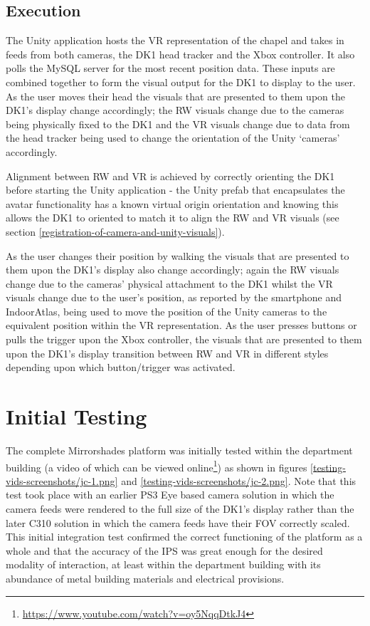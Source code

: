 \subsection{Execution}
The Unity application hosts the VR representation of the chapel and takes in feeds from both cameras, the DK1 head tracker and the Xbox controller. It also polls the MySQL server for the most recent position data. These inputs are combined together to form the visual output for the DK1 to display to the user. As the user moves their head the visuals that are presented to them upon the DK1's display change accordingly; the RW visuals change due to the cameras being physically fixed to the DK1 and the VR visuals change due to data from the head tracker being used to change the orientation of the Unity `cameras' accordingly.

Alignment between RW and VR is achieved by correctly orienting the DK1 before starting the Unity application - the Unity prefab that encapsulates the avatar functionality has a known virtual origin orientation and knowing this allows the DK1 to oriented to match it to align the RW and VR visuals (see section \ref{registration-of-camera-and-unity-visuals}).

As the user changes their position by walking the visuals that are presented to them upon the DK1's display also change accordingly; again the RW visuals change due to the cameras' physical attachment to the DK1 whilst the VR visuals change due to the user's position, as reported by the smartphone and IndoorAtlas, being used to move the position of the Unity cameras to the equivalent position within the VR representation. As the user presses buttons or pulls the trigger upon the Xbox controller, the visuals that are presented to them upon the DK1's display transition between RW and VR in different styles depending upon which button/trigger was activated.


\section{Initial Testing}
\label{initial-testing}
The complete Mirrorshades platform was initially tested within the department building (a video of which can be viewed online\footnote{\url{https://www.youtube.com/watch?v=oy5NqqDtkJ4}}) as shown in figures \ref{testing-vids-screenshots/jc-1.png} and \ref{testing-vids-screenshots/jc-2.png}. Note that this test took place with an earlier PS3 Eye based camera solution in which the camera feeds were rendered to the full size of the DK1's display rather than the later C310 solution in which the camera feeds have their FOV correctly scaled. This initial integration test confirmed the correct functioning of the platform as a whole and that the accuracy of the IPS was great enough for the desired modality of interaction, at least within the department building with its abundance of metal building materials and electrical provisions.

